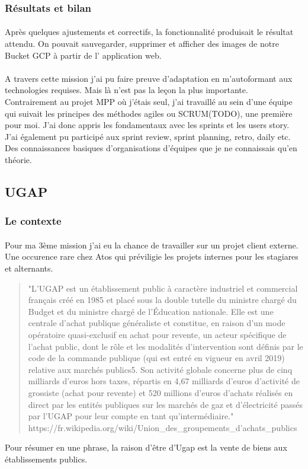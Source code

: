 \documentclass[12pt]{article}
\begin{document}
\begin {sloppypar}
\subsubsection{Résultats et bilan}
\paragraph{}
Après quelques ajustements et correctifs, la fonctionnalité produisait le résultat attendu. On 
pouvait sauvegarder, supprimer et afficher des images de notre Bucket GCP à partir de l'
application web. 
\paragraph{}
A travers cette mission j'ai pu faire preuve d'adaptation en m'autoformant aux technologies 
requises. Mais là n'est pas la leçon la plus importante. Contrairement au projet MPP où j'étais 
seul, j'ai travaillé au sein d'une équipe qui suivait les principes des méthodes agiles ou SCRUM(TODO),
une première pour moi. J'ai donc appris les fondamentaux avec les sprints et les users story. 
J'ai également pu participé aux sprint review, sprint planning, retro, daily etc. Des connaissances 
basiques d'organisations d'équipes que je ne connaissais qu'en théorie.

\newpage
\subsection{UGAP}
\subsubsection{Le contexte}
\paragraph{}
Pour ma 3ème mission j'ai eu la chance de travailler sur un projet client externe. Une occurence 
rare chez Atos qui préviligie les projets internes pour les stagiares et alternants.
\begin{quote}
  "L’UGAP est un établissement public à caractère industriel et commercial français créé en 
  1985 et placé sous la double tutelle du ministre chargé du Budget et du ministre chargé de 
  l'Éducation nationale. Elle est une centrale d'achat publique généraliste et constitue, 
  en raison d'un mode opératoire quasi-exclusif en achat pour revente, un acteur spécifique de 
  l’achat public, dont le rôle et les modalités d’intervention sont définis par le code de 
  la commande publique (qui est entré en vigueur en avril 2019) relative aux marchés publics5. 
  Son activité globale concerne plus de cinq milliards d'euros hors taxes, 
  répartis en 4,67 milliards d'euros d'activité de grossiste (achat pour revente) et 520 millions d'euros 
  d'achats réalisés en direct par les entités publiques sur les marchés de gaz et d'électricité passés par 
  l'UGAP pour leur compte en tant qu'intermédiaire." \linebreak 
  https://fr.wikipedia.org/wiki/Union\_des\_groupements\_d'achats\_publics 
\end{quote}
Pour résumer en une phrase, la raison d'être d'Ugap est la vente de biens aux établissements publics.

\end{sloppypar}
\end{document}
